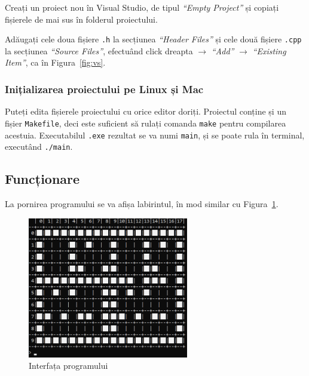 \documentclass[../ro-fa-lab.tex]{subfiles}
\begin{document}
Creați un proiect nou în Visual Studio, de tipul \textit{``Empty Project''} și copiați fișierele de mai sus în folderul proiectului.

Adăugați cele doua fișiere \texttt{.h} la secțiunea \textit{``Header Files''} și cele două fișiere \texttt{.cpp} la secțiunea \textit{``Source Files''}, efectuând click dreapta $\rightarrow$ \textit{``Add''} $\rightarrow$ \textit{``Existing Item''}, ca în Figura~\ref{fig:vs}.

\subsubsection{Inițializarea proiectului pe Linux și Mac}
Puteți edita fișierele proiectului cu orice editor doriți. Proiectul conține și un fișier \texttt{Makefile}, deci este suficient să rulați comanda \texttt{make} pentru compilarea acestuia. Executabilul \texttt{.exe} rezultat se va numi \texttt{main}, și se poate rula în terminal, executând \texttt{./main}.

\subsection{Funcționare}
La pornirea programului se va afișa labirintul, în mod similar cu Figura~\ref{fig:grid1}.

\begin{figure}[h]
    \centering
    \includegraphics[width=7cm]{../Resources/lab9/grid1.png}
    \caption{Interfața programului}
    \label{fig:grid1}
\end{figure}
\end{document}
